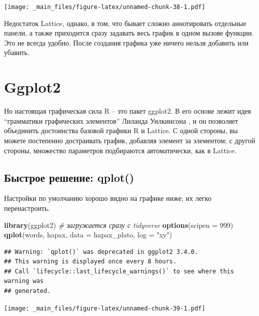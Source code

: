 \documentclass[
]{book}
\newenvironment{Shaded}{\begin{snugshade}}{\end{snugshade}}
\newcommand{\AttributeTok}[1]{\textcolor[rgb]{0.13,0.29,0.53}{#1}}
\newcommand{\CommentTok}[1]{\textcolor[rgb]{0.56,0.35,0.01}{\textit{#1}}}
\newcommand{\DecValTok}[1]{\textcolor[rgb]{0.00,0.00,0.81}{#1}}
\newcommand{\FunctionTok}[1]{\textcolor[rgb]{0.13,0.29,0.53}{\textbf{#1}}}
\newcommand{\NormalTok}[1]{#1}
\newcommand{\StringTok}[1]{\textcolor[rgb]{0.31,0.60,0.02}{#1}}
\theoremstyle{definition}
\theoremstyle{definition}
\theoremstyle{definition}
\theoremstyle{definition}
\theoremstyle{remark}
\begin{document}
\texttt{[image: \_main\_files/figure-latex/unnamed-chunk-38-1.pdf]}

Недостаток Lattice, однако, в том, что бывает сложно аннотировать отдельные панели, а также приходится сразу задавать весь график в одном вызове функции. Это не всегда удобно. После создания графика уже ничего нельзя добавить или убавить.

\hypertarget{ggplot2}{%
\section{Ggplot2}\label{ggplot2}}

Но настоящая графическая сила R -- это пакет ggplot2. В его основе лежит идея ``грамматики графических элементов'' Лиланда Уилкинсона \citep{мастицкий2017}, и он позволяет объединить достоинства базовой графики R и Lattice. С одной стороны, вы можете постепенно достраивать график, добавляя элемент за элементом; с другой стороны, множество параметров подбираются автоматически, как в Lattice.

\hypertarget{ux431ux44bux441ux442ux440ux43eux435-ux440ux435ux448ux435ux43dux438ux435-qplot}{%
\subsection{Быстрое решение: qplot()}\label{ux431ux44bux441ux442ux440ux43eux435-ux440ux435ux448ux435ux43dux438ux435-qplot}}

Настройки по умолчанию хорошо видно на графике ниже; их легко перенастроить.

\begin{Shaded}
\begin{Highlighting}[]
\FunctionTok{library}\NormalTok{(ggplot2) }\CommentTok{\# загружается сразу с tidyverse}
\FunctionTok{options}\NormalTok{(}\AttributeTok{scipen =} \DecValTok{999}\NormalTok{)}
\FunctionTok{qplot}\NormalTok{(words, hapax, }\AttributeTok{data =}\NormalTok{ hapax\_plato, }\AttributeTok{log =} \StringTok{"xy"}\NormalTok{)}
\end{Highlighting}
\end{Shaded}

\begin{verbatim}
## Warning: `qplot()` was deprecated in ggplot2 3.4.0.
## This warning is displayed once every 8 hours.
## Call `lifecycle::last_lifecycle_warnings()` to see where this warning was
## generated.
\end{verbatim}

\texttt{[image: \_main\_files/figure-latex/unnamed-chunk-39-1.pdf]}
\end{document}
